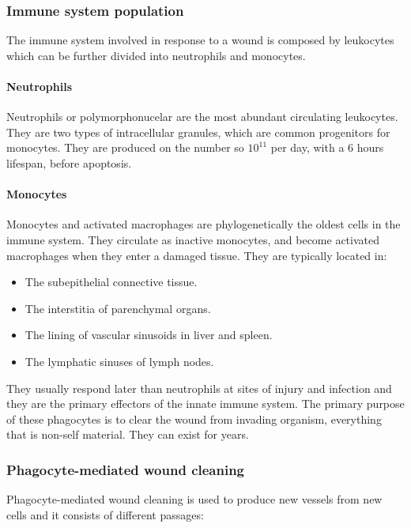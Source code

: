 		\subsubsection{Immune system population}
		The immune system involved in response to a wound is composed by leukocytes which can be further divided into neutrophils and monocytes.

			\paragraph{Neutrophils}
			Neutrophils or polymorphonucelar are the most abundant circulating leukocytes.
			They are two types of intracellular granules, which are common progenitors for monocytes.
			They are produced on the number so $10^{11}$ per day, with a $6$ hours lifespan, before apoptosis.

			\paragraph{Monocytes}
			Monocytes and activated macrophages are phylogenetically the oldest cells in the immune system.
			They circulate as inactive monocytes, and become activated macrophages when they enter a damaged tissue.
			They are typically located in:

			\begin{multicols}{2}
				\begin{itemize}
					\item The subepithelial connective tissue.
					\item The interstitia of parenchymal organs.
					\item The lining of vascular sinusoids in liver and spleen.
					\item The lymphatic sinuses of lymph nodes.
				\end{itemize}
			\end{multicols}

			They usually respond later than neutrophils at sites of injury and infection and they are the primary effectors of the innate immune system.
			The primary purpose of these phagocytes is to clear the wound from invading organism, everything that is non-self material.
			They can exist for years.

		\subsubsection{Phagocyte-mediated wound cleaning}
		Phagocyte-mediated wound cleaning is used to produce new vessels from new cells and it consists of different passages:

